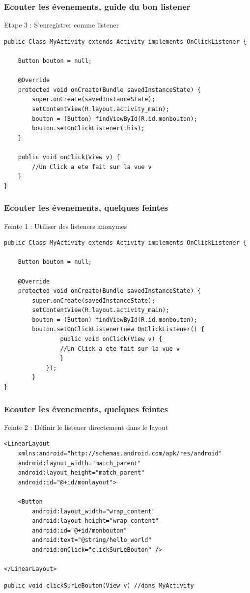 \documentclass{beamer}
\begin{document}
\begin{frame}[fragile]
\frametitle{Ecouter les évenements, guide du bon listener}
Etape 3 : S'enregistrer comme listener
\begin{lstlisting}
public Class MyActivity extends Activity implements OnClickListener {

    Button bouton = null;

    @Override
    protected void onCreate(Bundle savedInstanceState) {
        super.onCreate(savedInstanceState);
        setContentView(R.layout.activity_main);
        bouton = (Button) findViewById(R.id.monbouton);
        bouton.setOnClickListener(this);
    }
	
    public void onClick(View v) {
        //Un Click a ete fait sur la vue v
    }
}
\end{lstlisting}
\end{frame}
\begin{frame}[fragile]
\frametitle{Ecouter les évenements, quelques feintes}
Feinte 1 : Utiliser des listeners anonymes
\begin{lstlisting}
public Class MyActivity extends Activity implements OnClickListener {

    Button bouton = null;

    @Override
    protected void onCreate(Bundle savedInstanceState) {
        super.onCreate(savedInstanceState);
        setContentView(R.layout.activity_main);
        bouton = (Button) findViewById(R.id.monbouton);
        bouton.setOnClickListener(new OnClickListener() {
                public void onClick(View v) {
                //Un Click a ete fait sur la vue v
                }
            });
	    }
}
\end{lstlisting}
\end{frame}
\begin{frame}[fragile]
\frametitle{Ecouter les évenements, quelques feintes}
Feinte 2 : Définir le listener directement dans le layout
\begin{lstlisting}
<LinearLayout 
	xmlns:android="http://schemas.android.com/apk/res/android"
    android:layout_width="match_parent"
    android:layout_height="match_parent"
    android:id="@+id/monlayout">

    <Button
        android:layout_width="wrap_content"
        android:layout_height="wrap_content"
        android:id="@+id/monbouton"
        android:text="@string/hello_world"
        android:onClick="clickSurLeBouton" />

</LinearLayout>
\end{lstlisting}
\begin{lstlisting}
public void clickSurLeBouton(View v) //dans MyActivity
\end{lstlisting}
\end{frame}
\end{document}
